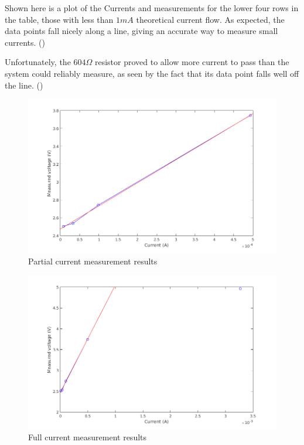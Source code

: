 \documentclass[11pt]{article} %
\begin{document}
Shown here is a plot of the Currents and measurements for the lower four rows in the table, those with less than $1mA$ theoretical current flow. As expected, the data points fall nicely along a line, giving an accurate way to measure small currents. ()

Unfortunately, the $604\Omega$ resistor proved to allow more current to pass than the system could reliably measure, as seen by the fact that its data point falls well off the line. ()



\begin{figure}[]
	\centering
	\includegraphics[width=\textwidth]{4points-current.png}
	\caption{Partial current measurement results}
 	\label{fig:some}
\end{figure}

\begin{figure}[]
	\centering
	\includegraphics[width=\textwidth]{5points-current.png}
	\caption{Full current measurement results}
 	\label{fig:current}
\end{figure}
\end{document}
